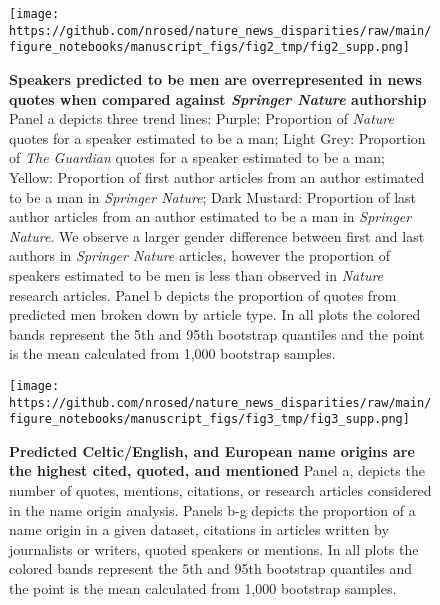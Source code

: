 \begin{fignos:tagged-figure}[Supplemental 3]

\begin{figure}
\hypertarget{fig:suppfig2}{%
\centering
\texttt{[image: https://github.com/nrosed/nature\_news\_disparities/raw/main/figure\_notebooks/manuscript\_figs/fig2\_tmp/fig2\_supp.png]}
\caption{\textbf{Speakers predicted to be men are overrepresented in news quotes when compared against \emph{Springer Nature} authorship}
Panel a depicts three trend lines: Purple: Proportion of \emph{Nature} quotes for a speaker estimated to be a man; Light Grey: Proportion of \emph{The Guardian} quotes for a speaker estimated to be a man; Yellow: Proportion of first author articles from an author estimated to be a man in \emph{Springer Nature}; Dark Mustard: Proportion of last author articles from an author estimated to be a man in \emph{Springer Nature}.
We observe a larger gender difference between first and last authors in \emph{Springer Nature} articles, however the proportion of speakers estimated to be men is less than observed in \emph{Nature} research articles.
Panel b depicts the proportion of quotes from predicted men broken down by article type.
In all plots the colored bands represent the 5th and 95th bootstrap quantiles and the point is the mean calculated from 1,000 bootstrap samples.}\label{fig:suppfig2}
}
\end{figure}

\end{fignos:tagged-figure}

\begin{fignos:tagged-figure}[Supplemental 4]

\begin{figure}
\hypertarget{fig:suppfig3}{%
\centering
\texttt{[image: https://github.com/nrosed/nature\_news\_disparities/raw/main/figure\_notebooks/manuscript\_figs/fig3\_tmp/fig3\_supp.png]}
\caption{\textbf{Predicted Celtic/English, and European name origins are the highest cited, quoted, and mentioned}
Panel a, depicts the number of quotes, mentions, citations, or research articles considered in the name origin analysis.
Panels b-g depicts the proportion of a name origin in a given dataset, citations in articles written by journalists or writers, quoted speakers or mentions.
In all plots the colored bands represent the 5th and 95th bootstrap quantiles and the point is the mean calculated from 1,000 bootstrap samples.}\label{fig:suppfig3}
}
\end{figure}

\end{fignos:tagged-figure}

